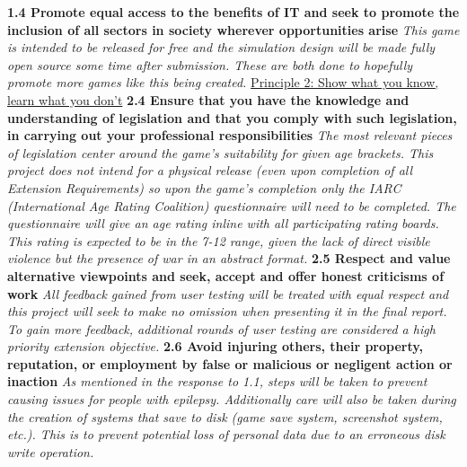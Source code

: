 \documentclass{report}
\begin{document}
\begin{raggedright}
\newline
\newline
\textbf{1.4 Promote equal access to the benefits of IT and seek to promote the inclusion of all sectors in society wherever opportunities arise}
\newline
\newline
\textit{This game is intended to be released for free and the simulation design will be made fully open source some time after submission. These are both done to hopefully promote more games like this being created.}
\newline
\newline
{\Large \underline{Principle 2: Show what you know, learn what you don't}}
\newline
\newline
\textbf{2.4 Ensure that you have the knowledge and understanding of legislation and that you comply with such legislation, in carrying out your professional responsibilities}
\newline
\newline
\textit{The most relevant pieces of legislation center around the game's suitability for given age brackets. This project does not intend for a physical release (even upon completion of all Extension Requirements) so upon the game's completion only the IARC (International Age Rating Coalition) questionnaire will need to be completed. The questionnaire will give an age rating inline with all participating rating boards. This rating is expected to be in the 7-12 range, given the lack of direct visible violence but the presence of war in an abstract format.}
\newline
\newline
\textbf{2.5 Respect and value alternative viewpoints and seek, accept and offer honest criticisms of work}
\newline
\newline
\textit{All feedback gained from user testing will be treated with equal respect and this project will seek to make no omission when presenting it in the final report. To gain more feedback, additional rounds of user testing are considered a high priority extension objective.}
\newline
\newline
\textbf{2.6 Avoid injuring others, their property, reputation, or employment by false or malicious or negligent action or inaction}
\newline
\newline
\textit{As mentioned in the response to 1.1, steps will be taken to prevent causing issues for people with epilepsy. Additionally care will also be taken during the creation of systems that save to disk (game save system, screenshot system, etc.). This is to prevent potential loss of personal data due to an erroneous disk write operation.}

\end{raggedright}
\end{document}
